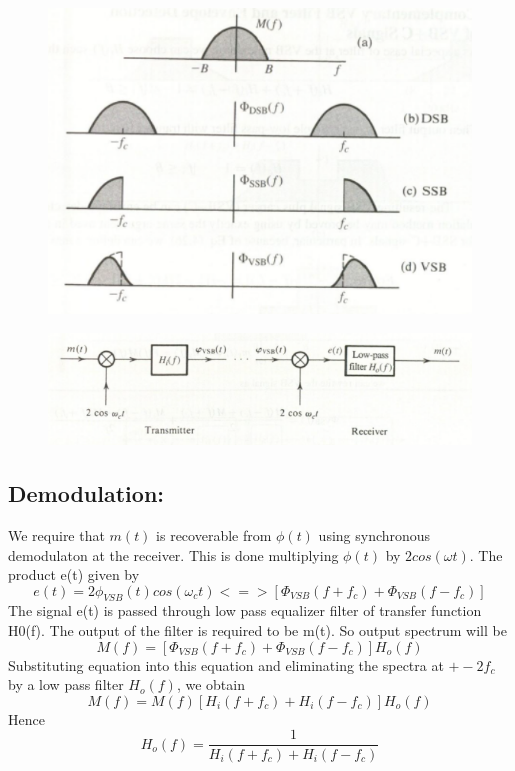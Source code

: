 \begin{figure}[h!]
    \centering
    \includegraphics{figures/fig_1.png}
    \caption{}
    \label{fig:1}
\end{figure}
\begin{figure}[h!]
    \centering
    \includegraphics{figures/fig_2.png}
    \caption{}
    \label{fig:2}
\end{figure}

\subsection{Demodulation:}

We require that  $m(t)$ is recoverable from $\phi(t)$ using synchronous demodulaton at the receiver. This is done multiplying $\phi(t)$ by $2cos(\omega t)$. The product e(t) given by
\begin{equation}
    e(t) = 2\phi_{VSB}(t)cos(\omega_ct) <=> [\Phi_{VSB}(f+f_c) + \Phi_{VSB}(f-f_c)]
\end{equation}
The signal e(t) is passed through low pass equalizer filter  of transfer function H0(f). The output of the filter is required to be m(t). So output spectrum will be
\begin{equation}
    M(f) = [\Phi_{VSB}(f+f_c) + \Phi_{VSB}(f-f_c)]H_o(f)
\end{equation}
Substituting equation into this equation and eliminating the spectra at $+-2f_c$ by a low pass filter $H_o(f)$, we obtain
\begin{equation}
    M(f) = M(f)[H_i(f+f_c) + H_i(f-f_c)]H_o(f)
\end{equation}
Hence
\begin{equation}
    H_o(f) = \frac{1}{H_i(f+f_c) + H_i(f-f_c)}
\end{equation}

